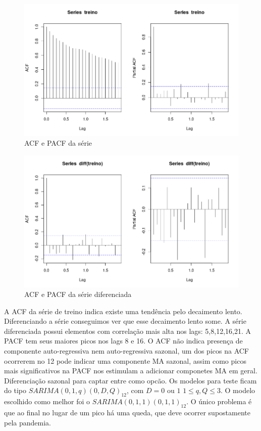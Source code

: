 \documentclass[10pt,a4paper]{article}
\begin{document}
\begin{figure}[h]
\centering
\includegraphics[width=.8 \linewidth]{../trendSARIMA.png} 
\caption{ACF e PACF da série}
\end{figure}

\begin{figure}[ht]
\centering
\includegraphics[width=.8 \linewidth]{../trendDIFF.png} 
\caption{ACF e PACF da série diferenciada}
\end{figure}
A ACF da série de treino indica existe uma tendência pelo decaimento lento. Diferenciando a série conseguimos ver que esse decaimento lento some. A série diferenciada possui elementos com correlação mais alta nos lags: 5,8,12,16,21. A PACF tem seus maiores picos nos lags 8 e 16. O ACF não indica presença de componente auto-regressiva nem  auto-regressiva sazonal, um dos picos na ACF ocorrerem no 12 pode indicar uma componente MA sazonal, assim como picos mais significativos na PACF nos estimulam a adicionar componetes MA em geral. Diferenciação sazonal para captar entre como opcão. Os modelos para teste ficam do tipo $SARIMA(0,1,q)(0,D,Q)_{12}$, com $D = \text{0 ou 1}$ $1 \leq q,Q \leq 3$. O modelo escolhido como melhor foi o $SARIMA(0,1,1)(0,1,1)_{12}$. O único problema é que ao final no lugar de um pico há uma queda, que deve ocorrer supostamente pela pandemia.
\end{document}
